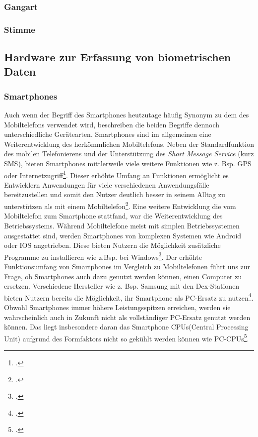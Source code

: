\subsubsection{Gangart}
\subsubsection{Stimme}
\subsection{Hardware zur Erfassung von biometrischen Daten}
\subsubsection{Smartphones}
Auch wenn der Begriff des Smartphones heutzutage häufig Synonym zu dem des Mobiltelefons verwendet wird, beschreiben die beiden Begriffe dennoch unterschiedliche Gerätearten. Smartphones sind im allgemeinen eine Weiterentwicklung des herkömmlichen Mobiltelefons. Neben der Standardfunktion des mobilen Telefonierens und der Unterstützung des \textit{Short Message Service} (kurz SMS), bieten Smartphones mittlerweile viele weitere Funktionen wie z. Bsp. GPS oder Internetzugriff\footcite[Vgl. ][S.3 Z.5ff]{Bou11}.\newline
Dieser erhöhte Umfang an Funktionen ermöglicht es Entwicklern Anwendungen für viele verschiedenen Anwendungsfälle bereitzustellen und somit den Nutzer deutlich besser in seinem Alltag zu unterstützen als mit einem Mobiltelefon\footcite[Vgl. ][Smartphones are tiny Computers]{Ada18}. Eine weitere Entwicklung die vom Mobiltelefon zum Smartphone stattfand, war die Weiterentwicklung des Betriebssystems. Während Mobiltelefone meist mit simplen Betriebssystemen ausgestattet sind, werden Smartphones von komplexen Systemen wie Android oder IOS angetrieben. Diese bieten Nutzern die Möglichkeit zusätzliche Programme zu installieren wie z.Bsp. bei Windows\footcite[Vgl. ][Mobile Operating Systems]{Ada18}.\newline
Der erhöhte Funktionsumfang von Smartphones im Vergleich zu Mobiltelefonen führt uns zur Frage, ob Smartphones auch dazu genutzt werden können, einen Computer zu ersetzen. Verschiedene Hersteller wie z. Bsp. Samsung mit den Dex-Stationen bieten Nutzern bereits die Möglichkeit, ihr Smartphone als PC-Ersatz zu nutzen\footcite{Kai18}. Obwohl Smartphones immer höhere Leistungsspitzen erreichen, werden sie wahrscheinlich auch in Zukunft nicht als vollständiger PC-Ersatz genutzt werden können. Das liegt insbesondere daran das Smartphone CPUs(Central Processing Unit) aufgrund des Formfaktors nicht so gekühlt werden können wie PC-CPUs\footcite[Vgl. ][Power and Heat]{Gav18}.\newline 
